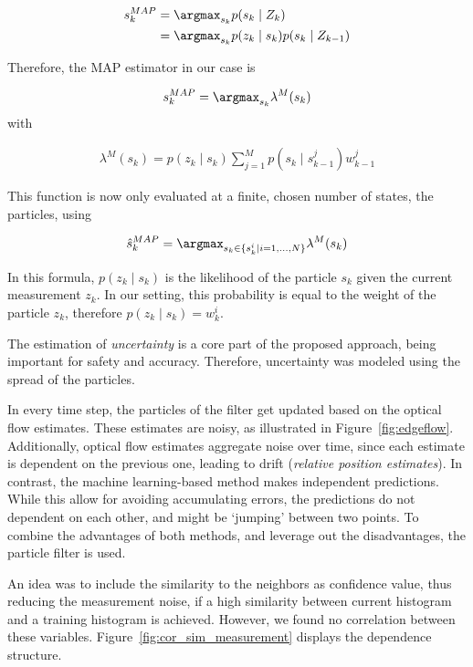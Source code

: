 \begin{align}
  s_k^{MAP}  &= \argmax_{s_k}{p(s_k \mid Z_k)}\\
             &= \argmax_{s_k}{p(z_k \mid s_k) p(s_k \mid Z_{k-1})} 
\end{align}

Therefore, the MAP estimator in our case is

\begin{align}
s_k^{MAP} = \argmax_{s_k} \lambda^M(s_k)
\end{align}
with

\begin{align}
\lambda^M(s_k) = p(z_k \mid s_k) \sum_{j=1}^Mp(s_k \mid s_{k-1}^j)w^j_{k-1}
\end{align}

This function is now only evaluated at a finite, chosen number of
states, the particles, using

\begin{align}
\hat{s}_k^{MAP} = \argmax_{s_k \in \{s_k^i \mid i=1,\ldots,N\}} \lambda^M(s_k)
\end{align}

In this formula, $p(z_k \mid s_k)$ is the likelihood of the particle
$s_k$ given the current measurement $z_k$. In our setting, this
probability is equal to the weight of the particle $z_k$, therefore
$p(z_k \mid s_k) = w^i_k$.

The estimation of \emph{uncertainty} is a core part of the proposed
approach, being important for safety and accuracy. Therefore,
uncertainty was modeled using the spread of the particles.

In every time step, the particles of the filter get updated based on
the optical flow estimates. These estimates are noisy, as illustrated
in Figure~\ref{fig:edgeflow}. Additionally, optical flow estimates
aggregate noise over time, since each estimate is dependent on the
previous one, leading to drift (\emph{relative position
  estimates}). In contrast, the machine learning-based method makes
independent predictions. While this allow for avoiding accumulating
errors, the predictions do not dependent on each other, and might be
`jumping' between two points. To combine the advantages of both
methods, and leverage out the disadvantages, the particle filter is
used.

An idea was to include the similarity to the neighbors as confidence
value, thus reducing the measurement noise, if a high similarity
between current histogram and a training histogram is
achieved. However, we found no correlation between these
variables. Figure~\ref{fig:cor_sim_measurement} displays the
dependence structure.